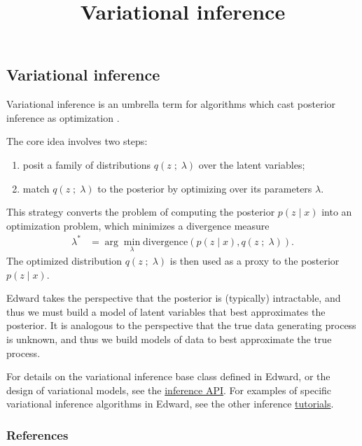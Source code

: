 \title{Variational inference}

\subsection{Variational inference}

Variational inference is an umbrella term for algorithms which cast
posterior inference as optimization
\citep{hinton1993keeping,waterhouse1996bayesian,jordan1999introduction}.

The core idea involves two steps:
\begin{enumerate}
   \item posit a family of distributions $q(z\;;\;\lambda)$ over the
   latent variables;
   \item match $q(z\;;\;\lambda)$ to the posterior by optimizing over its
   parameters $\lambda$.
 \end{enumerate}
This strategy converts the problem of computing the posterior $p(z \mid x)$ into
an optimization problem, which minimizes a divergence measure
\begin{align*}
  \lambda^*
  &=
  \arg\min_\lambda \text{divergence}(
  p(z \mid x)
  ,
  q(z\;;\;\lambda)
  ).
\end{align*}
The optimized distribution $q(z\;;\;\lambda)$ is then used as a
proxy to the posterior $p(z\mid x)$.

Edward takes the perspective that the posterior is (typically)
intractable, and thus we must build a model of latent variables that
best approximates the posterior.
It is analogous to the perspective
that the true data generating process is unknown, and thus we build
models of data to best approximate the true process.

For details on the variational inference base class defined in Edward,
or the design of variational models, see the
\href{/api/inferences}{inference API}.
For examples of specific variational inference algorithms in
Edward, see the other inference \href{/tutorials/}{tutorials}.

\subsubsection{References}\label{references}

